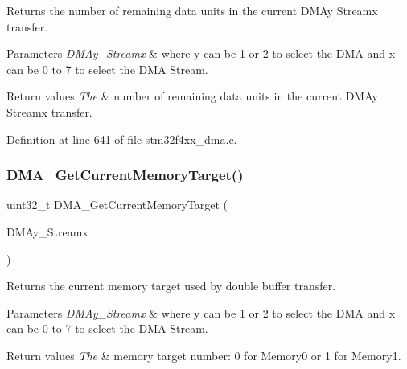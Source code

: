 Returns the number of remaining data units in the current D\+M\+Ay Streamx transfer. 


\begin{DoxyParams}{Parameters}
{\em D\+M\+Ay\+\_\+\+Streamx} & where y can be 1 or 2 to select the D\+MA and x can be 0 to 7 to select the D\+MA Stream. \\
\hline
\end{DoxyParams}

\begin{DoxyRetVals}{Return values}
{\em The} & number of remaining data units in the current D\+M\+Ay Streamx transfer. \\
\hline
\end{DoxyRetVals}


Definition at line 641 of file stm32f4xx\+\_\+dma.\+c.

\mbox{\label{group___d_m_a_ga74b6624f9faa2f43c9369ddbdeab241c}} 
\subsubsection{\texorpdfstring{D\+M\+A\+\_\+\+Get\+Current\+Memory\+Target()}{DMA\_GetCurrentMemoryTarget()}}
{\footnotesize\ttfamily uint32\+\_\+t D\+M\+A\+\_\+\+Get\+Current\+Memory\+Target (\begin{DoxyParamCaption}\item[{\hyperlink{struct_d_m_a___stream___type_def}{D\+M\+A\+\_\+\+Stream\+\_\+\+Type\+Def} $\ast$}]{D\+M\+Ay\+\_\+\+Streamx }\end{DoxyParamCaption})}



Returns the current memory target used by double buffer transfer. 


\begin{DoxyParams}{Parameters}
{\em D\+M\+Ay\+\_\+\+Streamx} & where y can be 1 or 2 to select the D\+MA and x can be 0 to 7 to select the D\+MA Stream. \\
\hline
\end{DoxyParams}

\begin{DoxyRetVals}{Return values}
{\em The} & memory target number\+: 0 for Memory0 or 1 for Memory1. \\
\hline
\end{DoxyRetVals}


